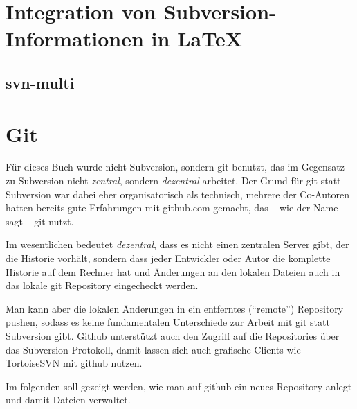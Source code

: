 \section{Integration von Subversion-Informationen in \LaTeX}

\subsection{svn-multi}


\section{Git}

Für dieses Buch wurde nicht Subversion, sondern git benutzt, das im Gegensatz zu Subversion nicht \textit{zentral}, sondern \textit{dezentral} arbeitet. Der Grund für git statt Subversion war dabei eher organisatorisch als technisch, mehrere der Co-Autoren hatten bereits gute Erfahrungen mit github.com gemacht, das -- wie der Name sagt -- git nutzt.

Im wesentlichen bedeutet \textit{dezentral}, dass es nicht einen zentralen Server gibt, der die Historie vorhält, sondern dass jeder Entwickler oder Autor die komplette Historie auf dem Rechner hat und Änderungen an den lokalen Dateien auch in das lokale git Repository eingecheckt werden. 

Man kann aber die lokalen Änderungen in ein entferntes (\enquote{remote}) Repository pushen, sodass es keine fundamentalen Unterschiede zur Arbeit mit git statt Subversion gibt.
Github unterstützt auch den Zugriff auf die Repositories über das Subversion-Protokoll, damit lassen sich auch grafische Clients wie TortoiseSVN mit github nutzen. 

Im folgenden soll gezeigt werden, wie man auf github ein neues Repository anlegt und damit Dateien verwaltet.




\endinput

Die aus Sicht des Autors beste Lösung ist daher eine Sicherung außerhalb des lokalen Rechners, idealerweise auch auf einem anderen Dateisystem. Der Grund hierfür ist technisch: Es sind Fälle bekannt, in denen Trojaner nicht nur die lokalen Dateien sondern auch alle Dateien auf angeschlossenen Netzlaufwerken verschlüsselten. Eine Sicherung auf einer Netzwerkfreigabe kann daher auch zu wenig sein. 



Und noch ein weiterer Aspekt soll genannt werden: die Arbeit mit mehreren Autoren und/oder auf mehreren Rechnern. Der Autor dieses Kapitels speichert wichtige Dokumente in einem Subversion-Repository. Soll mit einem anderem Rechner an den Dateien gearbeitet werden, so wird dort einfach ein neuer Checkout gemacht. Es darf nur am Ende der Arbeit nicht vergessen werden, die Dateien auch wieder mit dem Repository abzugleichen, dieser wichtige Schritt geht einem aber nach kurzer Zeit \enquote{in Fleisch und Blut} über.

